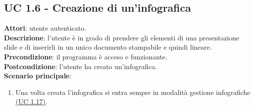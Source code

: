 \subsection{UC 1.6 - Creazione di un'infografica}{
	\label{uc1.6}
	\textbf{Attori}: utente autenticato. \\
	\textbf{Descrizione}: l'utente è in grado di prendere gli elementi di una presentazione slide e di inserirli in un unico documento stampabile e quindi lineare. \\
	\textbf{Precondizione}: il programma è acceso e funzionante.	\\
	\textbf{Postcondizione}: l'utente ha creato un'infografica.	\\
	\textbf{Scenario principale}:
	\begin{enumerate}
		\item Una volta creata l'infografica si entra sempre in modalità gestione infografiche \hyperref[uc1.17]{(UC 1.17)}.
	\end{enumerate}
	}
